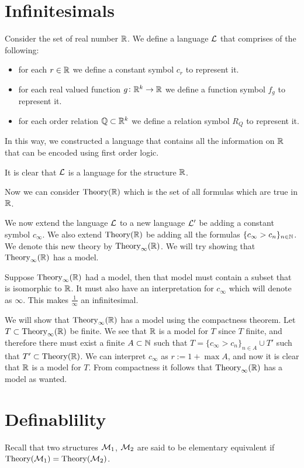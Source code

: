 \documentclass[11pt,a4paper]{article}
\begin{document}
  \section{Infinitesimals}
  Consider the set of real number $\mathbb{R}$.
  We define a language $\mathcal{L}$ that comprises of the following:
  \begin{itemize}
    \item for each $r \in \mathbb{R}$ we define a constant symbol $c_r$ to
      represent it.
    \item for each real valued function $g \colon \mathbb{R}^k \to \mathbb{R}$ we define
      a function symbol $f_g$ to represent it.
    \item for each order relation $\mathbb{Q} \subset \mathbb{R}^k$ we define a relation
      symbol $R_Q$ to represent it.
  \end{itemize}
  
  In this way, we constructed a language that contains all the information
  on $\mathbb{R}$ that can be encoded using first order logic.

  It is clear that $\mathcal{L}$ is a language for the structure $\mathbb{R}$.

  Now we can consider $\operatorname{Theory}(\mathbb{R})$ which is the set of all formulas
  which are true in $\mathbb{R}$.

  We now extend the language $\mathcal{L}$ to a new language $\mathcal{L}'$ be adding
  a constant symbol $c_\infty$. We also extend $\operatorname{Theory}(\mathbb{R})$ be adding
  all the formulas $\{c_\infty > c_n\}_{n \in \mathbb{N}}$. We denote this
  new theory by $\operatorname{Theory}_\infty(\mathbb{R})$. We will try showing that 
  $\operatorname{Theory}_\infty(\mathbb{R})$ has a model.

  Suppose $\operatorname{Theory}_\infty(\mathbb{R})$ had a model, then that model must contain
  a subset that is isomorphic to $\mathbb{R}$.
  It must also have an interpretation for $c_\infty$ which will denote 
  as $\infty$.
  This makes $\frac{1}{\infty}$ an infinitesimal.

  We will show that $\operatorname{Theory}_\infty(\mathbb{R})$ has a model using the compactness
  theorem.
  Let $T \subset \operatorname{Theory}_\infty(\mathbb{R})$ be finite.
  We see that $\mathbb{R}$ is a model for $T$ since $T$ finite,
  and therefore there must exist a finite $A \subset \mathbb{N}$ such that
  $T = \{c_\infty > c_n\}_{n \in A} \cup T'$ such that 
  $T' \subset \operatorname{Theory}(\mathbb{R})$.
  We can interpret $c_\infty$ as $r := 1 + \max A$, and now it is
  clear that $\mathbb{R}$ is a model for $T$.
  From compactness it follows that $\operatorname{Theory}_\infty(\mathbb{R})$ has a model
  as wanted.

  \section{Definablility}
  Recall that two structures $\mathcal{M}_1$, $\mathcal{M}_2$ are said to be elementary 
  equivalent if $\operatorname{Theory}(\mathcal{M}_1) = \operatorname{Theory}(\mathcal{M}_2)$.
\end{document}

